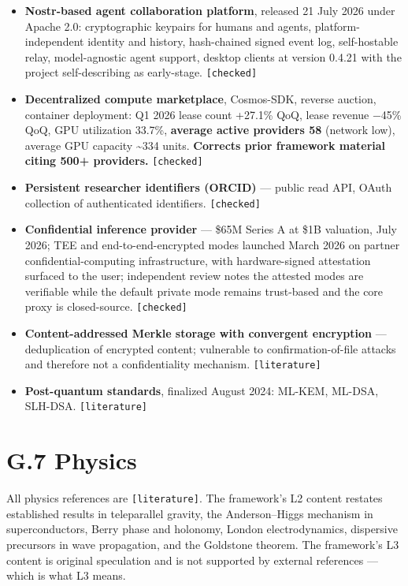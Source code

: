 \documentclass[
  11pt]{report}
\providecommand{\tightlist}{%
  \setlength{\itemsep}{0pt}\setlength{\parskip}{0pt}}
\begin{document}
\begin{itemize}
\tightlist
\item
  \textbf{Nostr-based agent collaboration platform}, released 21 July
  2026 under Apache 2.0: cryptographic keypairs for humans and agents,
  platform-independent identity and history, hash-chained signed event
  log, self-hostable relay, model-agnostic agent support, desktop
  clients at version 0.4.21 with the project self-describing as
  early-stage. \texttt{{[}checked{]}}
\item
  \textbf{Decentralized compute marketplace}, Cosmos-SDK, reverse
  auction, container deployment: Q1 2026 lease count +27.1\% QoQ, lease
  revenue −45\% QoQ, GPU utilization 33.7\%, \textbf{average active
  providers 58} (network low), average GPU capacity \textasciitilde334
  units. \textbf{Corrects prior framework material citing 500+
  providers.} \texttt{{[}checked{]}}
\item
  \textbf{Persistent researcher identifiers (ORCID)} --- public read
  API, OAuth collection of authenticated identifiers.
  \texttt{{[}checked{]}}
\item
  \textbf{Confidential inference provider} --- \$65M Series A at \$1B
  valuation, July 2026; TEE and end-to-end-encrypted modes launched
  March 2026 on partner confidential-computing infrastructure, with
  hardware-signed attestation surfaced to the user; independent review
  notes the attested modes are verifiable while the default private mode
  remains trust-based and the core proxy is closed-source.
  \texttt{{[}checked{]}}
\item
  \textbf{Content-addressed Merkle storage with convergent encryption}
  --- deduplication of encrypted content; vulnerable to
  confirmation-of-file attacks and therefore not a confidentiality
  mechanism. \texttt{{[}literature{]}}
\item
  \textbf{Post-quantum standards}, finalized August 2024: ML-KEM,
  ML-DSA, SLH-DSA. \texttt{{[}literature{]}}
\end{itemize}

\hypertarget{g.7-physics}{%
\section{G.7 Physics}\label{g.7-physics}}

All physics references are \texttt{{[}literature{]}}. The framework's L2
content restates established results in teleparallel gravity, the
Anderson--Higgs mechanism in superconductors, Berry phase and holonomy,
London electrodynamics, dispersive precursors in wave propagation, and
the Goldstone theorem. The framework's L3 content is original
speculation and is not supported by external references --- which is
what L3 means.
\end{document}
